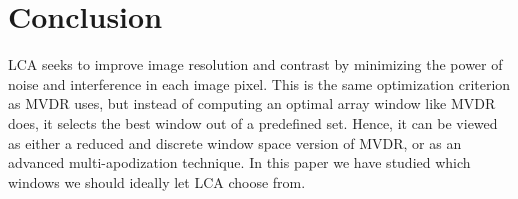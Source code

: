 \documentclass[10pt,journal,draftclsnofoot,onecolumn]{IEEEtran}
\let\MYoriglatexcaption\caption               %
\renewcommand{\caption}[2][\relax]{\MYoriglatexcaption[#2]{#2}}
\newcommand\Fig[1]{Fig.~\ref{#1}}
\newcommand\1{\vec 1}
\begin{document}
% 
% 


\section{Conclusion}\label{sec:conclusion}


LCA seeks to improve image resolution and contrast by minimizing the power of noise and interference in each image pixel. This is the same optimization criterion as MVDR uses, but instead of computing an optimal array window like MVDR does, it selects the best window out of a predefined set. Hence, it can be viewed as either a reduced and discrete window space version of MVDR, or as an advanced multi-apodization technique. In this paper we have studied which windows we should ideally let LCA choose from.
\end{document}
